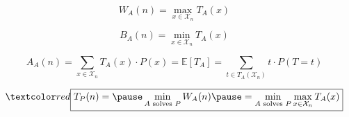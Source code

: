
\begin{frame}
  \begin{center}
	{}
  \end{center}

\end{frame}

\begin{frame}
  \begin{columns}
	  \begin{center}
	  \end{center}
	  \pause
	  \begin{center}
	  \end{center}
  \end{columns}

  \pause
  \vspace{0.60cm}
  \begin{center}
  \end{center}
\end{frame}

\begin{frame}{}
  \begin{center}
    {\large {}} \\[8pt]
    {\large {}}
  \end{center}

  \pause
  \[
	W_{A}(n) = \max_{x \in \mathcal{X}_{n}} T_{A}(x)
  \]

  \pause
  \[
	B_{A}(n) = \min_{x \in \mathcal{X}_{n}} T_{A}(x)
  \]

  \pause
  \[
	A_{A}(n) = \sum_{x \in \mathcal{X}_{n}} T_{A}(x) \cdot P(x)
		     = \mathbb{E} [T_{A}]
			 = \sum_{t \in T_{A}(\mathcal{X}_{n})} t \cdot P(T = t)
  \]

  \pause
  \vspace{0.40cm}
  \[
	\red{\boxed{T_{P}(n) = \pause \min_{A \text{ solves } P} W_{A}(n) \pause = \min_{A \text{ solves } P} \max_{x \in \mathcal{X}_{n}} T_{A}(x)}}
  \]
\end{frame}


